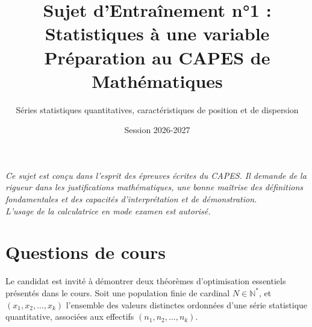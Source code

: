\documentclass[11pt,a4paper]{article}
\title{\textbf{Sujet d'Entraînement n°1 : Statistiques à une variable}\\\large Préparation au CAPES de Mathématiques}
\author{Séries statistiques quantitatives, caractéristiques de position et de dispersion}
\date{Session 2026-2027}
\begin{document}
\maketitle

\vspace{1cm}

\begin{center}
\textit{Ce sujet est conçu dans l'esprit des épreuves écrites du CAPES. Il demande de la rigueur dans les justifications mathématiques, une bonne maîtrise des définitions fondamentales et des capacités d'interprétation et de démonstration.\\ \vspace{0.5cm} L'usage de la calculatrice en mode examen est autorisé.}
\end{center}

\vspace{1.5cm}

\section*{Questions de cours}

Le candidat est invité à démontrer deux théorèmes d'optimisation essentiels présentés dans le cours. Soit une population finie de cardinal $N \in \mathbb{N}^*$, et $(x_1, x_2, \dots, x_k)$ l'ensemble des valeurs distinctes ordonnées d'une série statistique quantitative, associées aux effectifs $(n_1, n_2, \dots, n_k)$.
\end{document}
